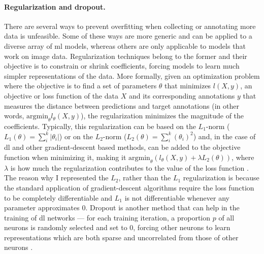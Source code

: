 \paragraph{Regularization and dropout.} There are several ways to prevent overfitting when collecting or annotating more data is unfeasible. Some of these ways are more generic and can be applied to a diverse array of \ac{ml} models, whereas others are only applicable to models that work on image data. Regularization techniques belong to the former and their objective is to constrain or shrink coefficients, forcing models to learn much simpler representations of the data. More formally, given an optimization problem where the objective is to find a set of parameters $\theta$ that minimizes $l(X,y)$, an objective or loss function of the data $X$ and its corresponding annotations $y$ that measures the distance between predictions and target annotations (in other words, $\mathrm{arg min}_{\theta}l_{\theta}(X,y)$), the regularization minimizes the magnitude of the coefficients. Typically, this regularization can be based on the $L_1$-norm ($L_1(\theta) = \sum_i^k{|\theta_i|}$) or on the $L_2$-norm ($L_2(\theta) = \sum_i^k{(\theta_i)^2}$) and, in the case of \ac{dl} and other gradient-descent based methods, can be added to the objective function when minimizing it, making it $\mathrm{arg min}_{\theta}(l_{\theta}(X,y)+\lambda L_2(\theta))$, where $\lambda$ is how much the regularization contributes to the value of the loss function \cite{James2013-py}. The reason why I represented the $L_2$, rather than the $L_1$ regularization is because the standard application of gradient-descent algorithms require the loss function to be completely differentiable and $L_1$ is not differentiable whenever any parameter approximates $0$. Dropout is another method that can help in the training of \ac{dl} networks --- for each training iteration, a proportion $p$ of all neurons is randomly selected and set to $0$, forcing other neurons to learn representations which are both sparse and uncorrelated from those of other neurons \cite{Srivastava2014a}. 

